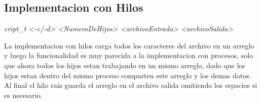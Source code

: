 \documentclass[paper=a4, fontsize=11pt]{scrartcl} %
\begin{document}
\subsection{Implementacion con Hilos}

\emph{cript\_t <-c/-d> <NumeroDeHijos> <archivoEntrada> <archivoSalida>}

La implementacion con hilos carga todos los caracteres del archivo en un arreglo y luego la funcionalidad es muy parecida a la implementacion con procesos, solo que ahora todos los hijos estan trabajando en un mismo arreglo, dado que los hijos estan dentro del mismo proceso comparten este arreglo y los demas datos. Al final el hilo raiz guarda el arreglo en el archivo salida omitiendo los espacios si es necesario.
\end{document}
